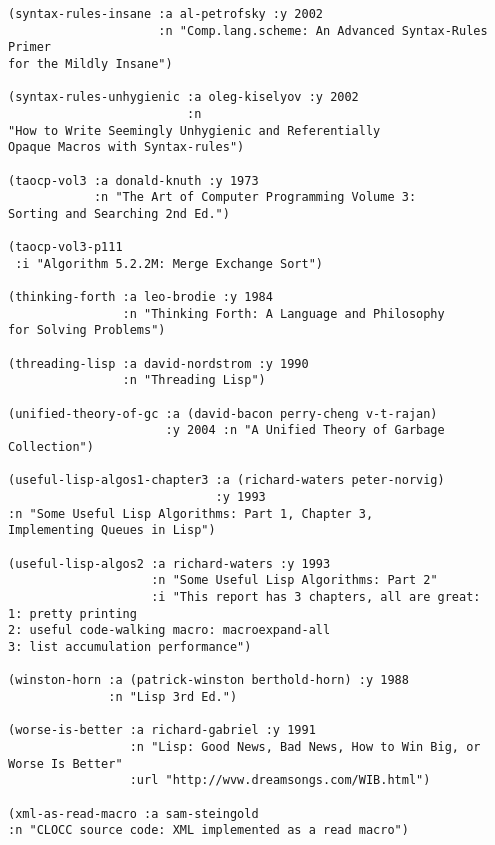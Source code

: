 \begin{verbatim}
(syntax-rules-insane :a al-petrofsky :y 2002
                     :n "Comp.lang.scheme: An Advanced Syntax-Rules Primer
for the Mildly Insane")

(syntax-rules-unhygienic :a oleg-kiselyov :y 2002
                         :n
"How to Write Seemingly Unhygienic and Referentially
Opaque Macros with Syntax-rules")

(taocp-vol3 :a donald-knuth :y 1973
            :n "The Art of Computer Programming Volume 3:
Sorting and Searching 2nd Ed.")

(taocp-vol3-p111
 :i "Algorithm 5.2.2M: Merge Exchange Sort")

(thinking-forth :a leo-brodie :y 1984
                :n "Thinking Forth: A Language and Philosophy
for Solving Problems")

(threading-lisp :a david-nordstrom :y 1990
                :n "Threading Lisp")

(unified-theory-of-gc :a (david-bacon perry-cheng v-t-rajan)
                      :y 2004 :n "A Unified Theory of Garbage Collection")

(useful-lisp-algos1-chapter3 :a (richard-waters peter-norvig)
                             :y 1993
:n "Some Useful Lisp Algorithms: Part 1, Chapter 3,
Implementing Queues in Lisp")

(useful-lisp-algos2 :a richard-waters :y 1993
                    :n "Some Useful Lisp Algorithms: Part 2"
                    :i "This report has 3 chapters, all are great:
1: pretty printing
2: useful code-walking macro: macroexpand-all
3: list accumulation performance")

(winston-horn :a (patrick-winston berthold-horn) :y 1988
              :n "Lisp 3rd Ed.")

(worse-is-better :a richard-gabriel :y 1991
                 :n "Lisp: Good News, Bad News, How to Win Big, or
Worse Is Better"
                 :url "http://wvw.dreamsongs.com/WIB.html")

(xml-as-read-macro :a sam-steingold
:n "CLOCC source code: XML implemented as a read macro")
\end{verbatim}
